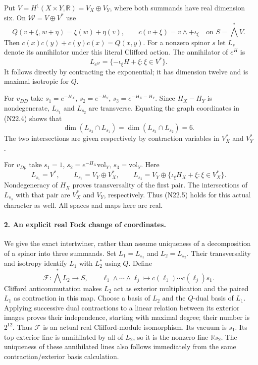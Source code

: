 Put $V=H^1(X\times Y,\mathbb R)=V_X\oplus V_Y$,
where both summands have real dimension six. On
$\mathcal W=V\oplus V^*$ use
\[
 Q(v+\xi,w+\eta)=\xi(w)+\eta(v),\qquad
 c(v+\xi)=v\wedge+\iota_\xi
                 \quad\text{on }S=\bigwedge^*V.
\]
Then $c(x)c(y)+c(y)c(x)=Q(x,y)$.
For a nonzero spinor $s$ let $L_s$ denote its annihilator
under this literal Clifford action. The annihilator of $e^H$ is
\begin{equation}
 L_{e^H}=\{-\iota_\xi H+\xi:\xi\in V^*\}.
                                                               \tag{N22.4}
\end{equation}
It follows directly by contracting the exponential; it has
dimension twelve and is maximal isotropic for $Q$.

For $v_{DD}$ take $s_1=e^{-H_X}$, $s_2=e^{-H_Y}$,
$s_3=e^{-H_X-H_Y}$. Since $H_X-H_Y$ is nondegenerate,
$L_{s_1}$ and $L_{s_2}$ are transverse. Equating the graph
coordinates in (N22.4) shows that
\begin{equation}
 \dim(L_{s_3}\cap L_{s_1})
   =\dim(L_{s_3}\cap L_{s_2})=6.                    \tag{N22.5}
\end{equation}
The two intersections are given respectively by contraction
variables in $V_X^*$ and $V_Y^*$.

For $v_{Dp}$ take $s_1=1$, $s_2=e^{-H_X}\mathrm{vol}_Y$,
$s_3=\mathrm{vol}_Y$. Here
\[
 L_{s_1}=V^*,\qquad L_{s_3}=V_Y\oplus V_X^*,\qquad
 L_{s_2}=V_Y\oplus
           \{\iota_\xi H_X+\xi:\xi\in V_X^*\}.
\]
Nondegeneracy of $H_X$ proves transversality of the first pair.
The intersections of $L_{s_3}$ with that pair are
$V_X^*$ and $V_Y$, respectively. Thus (N22.5) holds for
this actual character as well. All spaces and maps here are real.

\paragraph{2. An explicit real Fock change of coordinates.}
We give the exact intertwiner, rather than assume uniqueness of
a decomposition of a spinor into three summands.
Set $L_1=L_{s_1}$ and $L_2=L_{s_2}$. Their transversality
and isotropy identify $L_1$ with $L_2^*$ using $Q$.
Define
\begin{equation}
 \mathcal F:\bigwedge^*L_2\longrightarrow S,\qquad
 \ell_1\wedge\cdots\wedge\ell_j\longmapsto
                  c(\ell_1)\cdots c(\ell_j)s_1.      \tag{N22.6}
\end{equation}
Clifford anticommutation makes $L_2$ act as exterior
multiplication and the paired $L_1$ as contraction in this
map. Choose a basis of $L_2$ and the $Q$-dual basis of $L_1$.
Applying successive dual contractions to a linear relation
between its exterior images proves their independence, starting
with maximal degree; their number is $2^{12}$. Thus
$\mathcal F$ is an actual real Clifford-module isomorphism.
Its vacuum is $s_1$. Its top exterior line is annihilated by
all of $L_2$, so it is the nonzero line $\mathbb R s_2$.
The uniqueness of these annihilated lines also follows immediately
from the same contraction/exterior basis calculation.

